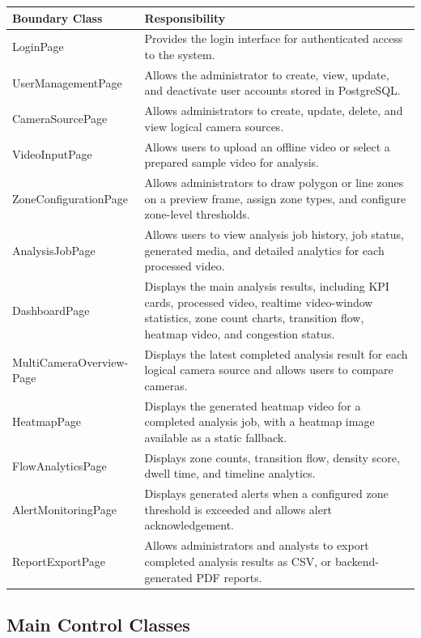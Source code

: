 \documentclass[12pt,a4paper]{report}
\begin{document}
\begin{longtable}{|p{4.2cm}|p{9.6cm}|}
\hline
\rowcolor{HeaderBlue}
\textbf{Boundary Class} & \textbf{Responsibility} \\
\hline
LoginPage & Provides the login interface for authenticated access to the system. \\
\hline
UserManagementPage & Allows the administrator to create, view, update, and deactivate user accounts stored in PostgreSQL. \\
\hline
CameraSourcePage & Allows administrators to create, update, delete, and view logical camera sources. \\
\hline
VideoInputPage & Allows users to upload an offline video or select a prepared sample video for analysis. \\
\hline
ZoneConfigurationPage & Allows administrators to draw polygon or line zones on a preview frame, assign zone types, and configure zone-level thresholds. \\
\hline
AnalysisJobPage & Allows users to view analysis job history, job status, generated media, and detailed analytics for each processed
video. \\
\hline
DashboardPage & Displays the main analysis results, including KPI cards, processed video, realtime video-window statistics, zone count charts, transition flow, heatmap video, and congestion status. \\
\hline
MultiCameraOverview-Page & Displays the latest completed analysis result for each logical camera source and allows users to compare cameras. \\
\hline
HeatmapPage & Displays the generated heatmap video for a completed analysis job, with a heatmap image available as a static fallback. \\
\hline
FlowAnalyticsPage & Displays zone counts, transition flow, density score, dwell time, and timeline analytics. \\
\hline
AlertMonitoringPage & Displays generated alerts when a configured zone threshold is exceeded and allows alert acknowledgement. \\
\hline
ReportExportPage & Allows administrators and analysts to export completed analysis results as CSV, or backend-generated PDF reports. \\
\hline
\end{longtable}

\subsection*{Main Control Classes}
\end{document}

